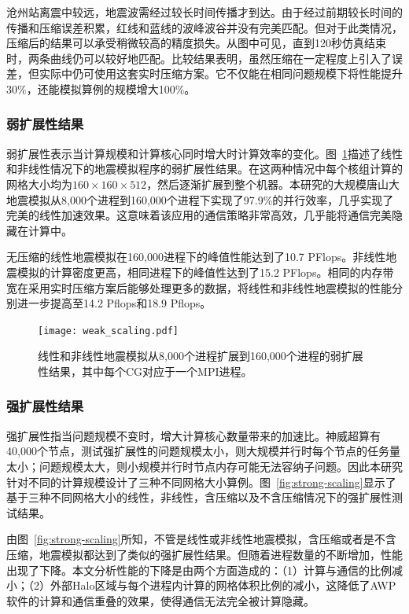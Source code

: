 沧州站离震中较远，地震波需经过较长时间传播才到达。由于经过前期较长时间的传播和压缩误差积累，红线和蓝线的波峰波谷并没有完美匹配。但对于此类情况，压缩后的结果可以承受稍微较高的精度损失。从图中可见，直到120秒仿真结束时，两条曲线仍可以较好地匹配。比较结果表明，虽然压缩在一定程度上引入了误差，但实际中仍可使用这套实时压缩方案。它不仅能在相同问题规模下将性能提升30\%，还能模拟算例的规模增大100\%。

\subsubsection{弱扩展性结果}

弱扩展性表示当计算规模和计算核心同时增大时计算效率的变化。图~\ref {fig:weak-scaling}描述了线性和非线性情况下的地震模拟程序的弱扩展性结果。在这两种情况中每个核组计算的网格大小均为$160\times 160 \times 512$，然后逐渐扩展到整个机器。本研究的大规模唐山大地震模拟从8,000个进程到160,000个进程下实现了97.9\%的并行效率，几乎实现了完美的线性加速效果。这意味着该应用的通信策略非常高效，几乎能将通信完美隐藏在计算中。

无压缩的线性地震模拟在160,000进程下的峰值性能达到了10.7 PFlops。非线性地震模拟的计算密度更高，相同进程下的峰值性达到了15.2 PFlops。相同的内存带宽在采用实时压缩方案后能够处理更多的数据，将线性和非线性地震模拟的性能分别进一步提高至14.2 Pflops和18.9 Pflops。

\begin{figure}[ht]
\centering
\texttt{[image: weak\_scaling.pdf]}
\caption{线性和非线性地震模拟从8,000个进程扩展到160,000个进程的弱扩展性结果，其中每个CG对应于一个MPI进程。}
\label{fig:weak-scaling}
\end{figure}

\subsubsection{强扩展性结果}

强扩展性指当问题规模不变时，增大计算核心数量带来的加速比。神威超算有40,000个节点，测试强扩展性的问题规模太小，则大规模并行时每个节点的任务量太小；问题规模太大，则小规模并行时节点内存可能无法容纳子问题。因此本研究针对不同的计算规模设计了三种不同网格大小算例。图~\ref {fig:strong-scaling}显示了基于三种不同网格大小的线性，非线性，含压缩以及不含压缩情况下的强扩展性测试结果。 

由图~\ref {fig:strong-scaling}所知，不管是线性或非线性地震模拟，含压缩或者是不含压缩，地震模拟都达到了类似的强扩展性结果。但随着进程数量的不断增加，性能出现了下降。本文分析性能的下降是由两个方面造成的：（1）计算与通信的比例减小；（2）外部Halo区域与每个进程内计算的网格体积比例的减小，这降低了AWP软件的计算和通信重叠的效果，使得通信无法完全被计算隐藏。

